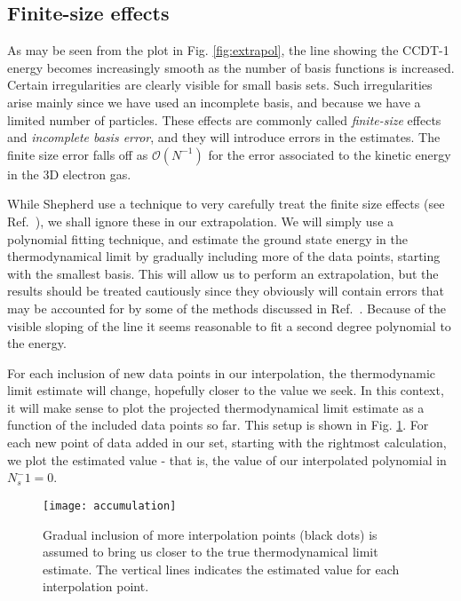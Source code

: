 \subsection{Finite-size effects}

As may be seen from the plot in Fig. \ref{fig:extrapol}, the line showing the CCDT-1 energy becomes increasingly smooth as the number of basis functions is increased. Certain irregularities are clearly visible for small basis sets. Such irregularities arise mainly since we have used an incomplete basis, and because we have a limited number of particles. These effects are commonly called \emph{finite-size} effects and \emph{incomplete basis error}, and they will introduce errors in the estimates. The finite size error falls off as $\mathcal{O}(N^{-1})$ for the error associated to the kinetic energy in the 3D electron gas. \cite{DrummondNotes}

While Shepherd use a technique to very carefully treat the finite size effects (see Ref.~\cite{Shepherd2013}), we shall ignore these in our extrapolation. We will simply use a polynomial fitting technique, and estimate the ground state energy in the thermodynamical limit by gradually including more of the data points, starting with the smallest basis. This will allow us to perform an extrapolation, but the results should be treated cautiously since they obviously will contain errors that may be accounted for by some of the methods discussed in Ref.~\cite{DrummondNotes}. Because of the visible sloping of the line it seems reasonable to fit a second degree polynomial to the energy.

For each inclusion of new data points in our interpolation, the thermodynamic limit estimate will change, hopefully closer to the value we seek. In this context, it will make sense to plot the projected thermodynamical limit estimate as a function of the included data points so far. This setup is shown in Fig. \ref{fig:accumulation}. For each new point of data added in our set, starting with the rightmost calculation, we plot the estimated value - that is, the value of our interpolated polynomial in $N_s^-1 = 0$.

\begin{figure}[p]
    \centering
    \texttt{[image: accumulation]}
    \caption{Gradual inclusion of more interpolation points (black dots) is assumed to bring us closer to the true thermodynamical limit estimate. The vertical lines indicates the estimated value for each interpolation point. }
    \label{fig:accumulation}
\end{figure}

